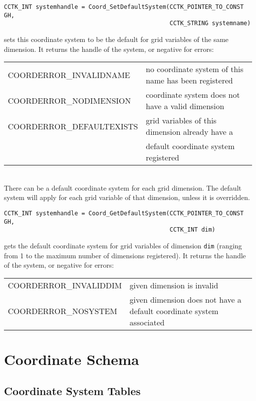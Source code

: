 \begin{verbatim}
CCTK_INT systemhandle = Coord_SetDefaultSystem(CCTK_POINTER_TO_CONST GH,
                                               CCTK_STRING systemname)
\end{verbatim}
sets this coordinate system to be the default for grid variables of
the same dimension.  It returns the handle of the system, or negative
for errors:\beforetable
\begin{tabular}{ll}
COORDERROR\_INVALIDNAME   & no coordinate system of this name has been 
			    registered\\
COORDERROR\_NODIMENSION   & coordinate system does not have a valid dimension\\
COORDERROR\_DEFAULTEXISTS & grid variables of this dimension already have a \\
                          & default coordinate system registered\\
\end{tabular}
\\There can be a default coordinate system for each grid dimension.  The
default system will apply for each grid variable of that dimension,
unless it is overridden.

\begin{verbatim}
CCTK_INT systemhandle = Coord_GetDefaultSystem(CCTK_POINTER_TO_CONST GH,
                                               CCTK_INT dim)
\end{verbatim}
gets the default coordinate system for grid variables of dimension {\tt dim}
(ranging from 1 to the maximum number of dimensions registered).
It returns the handle of the system, or negative for errors:\beforetable
\begin{tabular}{ll}
COORDERROR\_INVALIDDIM   & given dimension is invalid\\
COORDERROR\_NOSYSTEM     & given dimension does not have a default coordinate 
                           system associated
\end{tabular}


\section{Coordinate Schema}
\label{CactusBase_CoordBase_coordinate_schema}

\subsection{Coordinate System Tables}
\label{CactusBase_CoordBase_system_tables}

